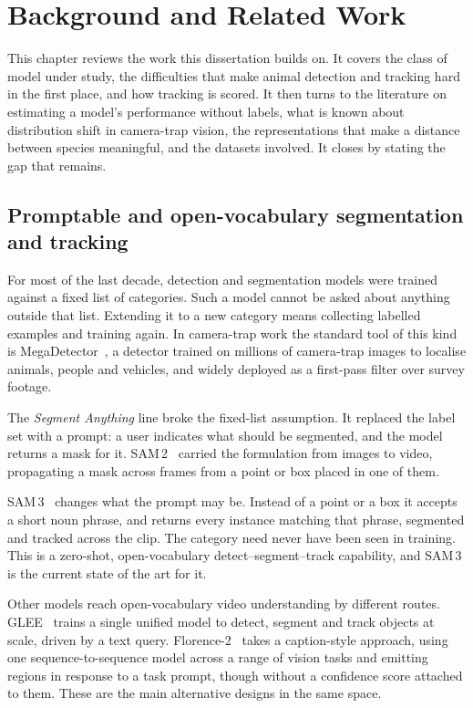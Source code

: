 \chapter{Background and Related Work}
\label{ch:background}

This chapter reviews the work this dissertation builds on. It covers the class of model under study, the
difficulties that make animal detection and tracking hard in the first place, and how tracking is scored. It
then turns to the literature on estimating a model's performance without labels, what is known about
distribution shift in camera-trap vision, the representations that make a distance between species
meaningful, and the datasets involved. It closes by stating the gap that remains.

\section{Promptable and open-vocabulary segmentation and tracking}
\label{sec:bg-promptable}
For most of the last decade, detection and segmentation models were trained against a fixed list of
categories. Such a model cannot be asked about anything outside that list. Extending it to a new category
means collecting labelled examples and training again. In camera-trap work the standard tool of this kind is
MegaDetector~\cite{megadetector}, a detector trained on millions of camera-trap images to localise animals,
people and vehicles, and widely deployed as a first-pass filter over survey footage.

The \emph{Segment Anything} line broke the fixed-list assumption. It replaced the label set with a prompt: a
user indicates what should be segmented, and the model returns a mask for it. SAM\,2~\cite{sam2} carried the
formulation from images to video, propagating a mask across frames from a point or box placed in one of them.

SAM\,3~\cite{sam3} changes what the prompt may be. Instead of a point or a box it accepts a short noun
phrase, and returns every instance matching that phrase, segmented and tracked across the clip. The category
need never have been seen in training. This is a zero-shot, open-vocabulary detect--segment--track
capability, and SAM\,3 is the current state of the art for it.

Other models reach open-vocabulary video understanding by different routes. GLEE~\cite{glee} trains a single
unified model to detect, segment and track objects at scale, driven by a text query. Florence-2~\cite{florence2}
takes a caption-style approach, using one sequence-to-sequence model across a range of vision tasks and
emitting regions in response to a task prompt, though without a confidence score attached to them. These are
the main alternative designs in the same space.

